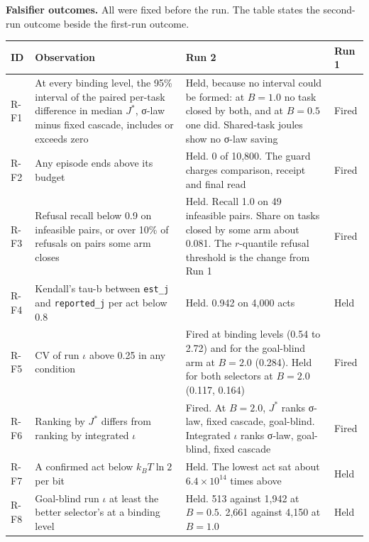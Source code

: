\documentclass[
  10pt,
]{article}
\newcounter{none} %
\begin{document}
\textbf{Falsifier outcomes.} All were fixed before the run. The table
states the second-run outcome beside the first-run outcome.

{\def\LTcaptype{none} %
\begin{longtable}[]{@{}
  >{\raggedright\arraybackslash}p{}
  >{\raggedright\arraybackslash}p{}
  >{\raggedright\arraybackslash}p{}
  >{\raggedright\arraybackslash}p{}@{}}
\toprule\noalign{}
\begin{minipage}[b]{\linewidth}\raggedright
ID
\end{minipage} & \begin{minipage}[b]{\linewidth}\raggedright
Observation
\end{minipage} & \begin{minipage}[b]{\linewidth}\raggedright
Run 2
\end{minipage} & \begin{minipage}[b]{\linewidth}\raggedright
Run 1
\end{minipage} \\
\midrule\noalign{}
\endhead
\bottomrule\noalign{}
\endlastfoot
R-F1 & At every binding level, the 95\% interval of the paired per-task
difference in median \(J^*\), σ-law minus fixed cascade, includes or
exceeds zero & Held, because no interval could be formed: at \(B = 1.0\)
no task closed by both, and at \(B = 0.5\) one did. Shared-task joules
show no σ-law saving & Fired \\
R-F2 & Any episode ends above its budget & Held. 0 of 10,800. The guard
charges comparison, receipt and final read & Fired \\
R-F3 & Refusal recall below 0.9 on infeasible pairs, or over 10\% of
refusals on pairs some arm closes & Held. Recall 1.0 on 49 infeasible
pairs. Share on tasks closed by some arm about 0.081. The \(r\)-quantile
refusal threshold is the change from Run 1 & Fired \\
R-F4 & Kendall's tau-b between \texttt{est\_j} and \texttt{reported\_j}
per act below 0.8 & Held. 0.942 on 4,000 acts & Held \\
R-F5 & CV of run \(\iota\) above 0.25 in any condition & Fired at
binding levels (0.54 to 2.72) and for the goal-blind arm at \(B = 2.0\)
(0.284). Held for both selectors at \(B = 2.0\) (0.117, 0.164) &
Fired \\
R-F6 & Ranking by \(J^*\) differs from ranking by integrated \(\iota\) &
Fired. At \(B = 2.0\), \(J^*\) ranks σ-law, fixed cascade, goal-blind.
Integrated \(\iota\) ranks σ-law, goal-blind, fixed cascade & Fired \\
R-F7 & A confirmed act below \(k_B T\ln 2\) per bit & Held. The lowest
act sat about \(6.4 \times 10^{14}\) times above & Held \\
R-F8 & Goal-blind run \(\iota\) at least the better selector's at a
binding level & Held. 513 against 1,942 at \(B = 0.5\). 2,661 against
4,150 at \(B = 1.0\) & Held \\
\end{longtable}
}
\end{document}
